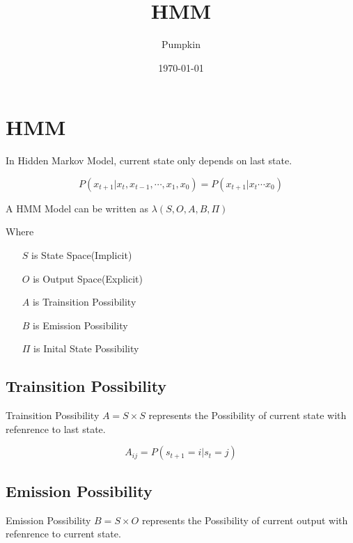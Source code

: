 \documentclass[a4paper,12pt]{article}
\title{HMM}
\date{\today}
\author{Pumpkin}
\begin{document}
    \maketitle
    \tableofcontents

    \section{HMM}

        In Hidden Markov Model, current state only depends on last state.

        \begin{equation}
            P(x_{t+1}|x_t,x_{t-1},\cdots ,x_1,x_0)=P(x_{t+1}|x_t\cdots x_0)
        \end{equation}

        A HMM Model can be written as $\lambda(S,O,A,B,\Pi)$

        Where

        \begin{itemize}
            \item [$S$] is State Space(Implicit)
            \item [$O$] is Output Space(Explicit)
            \item [$A$] is Trainsition Possibility
            \item [$B$] is Emission Possibility
            \item [$\Pi$] is Inital State Possibility
        \end{itemize}

        \subsection{Trainsition Possibility}

            Trainsition Possibility $A=S\times S$ represents the Possibility of current state with refenrence to last state.

            \begin{equation}
                A_{ij}=P(s_{t+1}=i|s_t=j)
            \end{equation}

        \subsection{Emission Possibility}

            Emission Possibility $B=S\times O$ represents the Possibility of current output with refenrence to current state.
\end{document}
